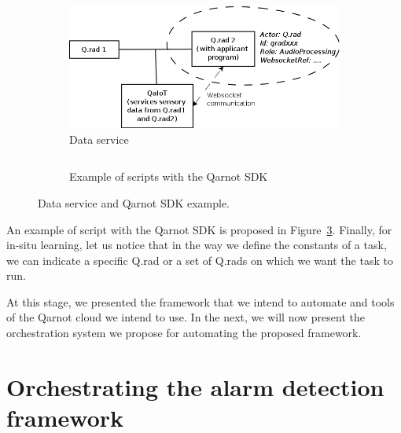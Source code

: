 \documentclass[10pt, conference, compsocconf]{IEEEtran}
\begin{document}
	\begin{figure}[ht]
          \begin{subfigure}[b]{0.4\textwidth}
            \captionsetup{skip=0pt}
            \centering
            \includegraphics[scale=0.25]{./Figures/DataService.png}
            \caption{Data service \label{subfig:qaiot}}
          \end{subfigure}
          \begin{subfigure}[b]{0.6\textwidth}
            \captionsetup{skip=0pt}
            \centering
            \inputminted[baselinestretch=1, bgcolor=LightGray, fontsize=\scriptsize]{python}{sample.py}
            \caption{Example of scripts with the Qarnot SDK \label{subfig:sample}}
          \end{subfigure}
          \caption{Data service and Qarnot SDK example.} 
          \label{fig:arch}
	\end{figure}

An example of script with the Qarnot SDK is proposed in Figure~\ref{fig:arch}. Finally, for in-situ learning, let us notice that 
in the way we define the constants of a task, we can indicate a specific Q.rad or a set of Q.rads on which we want the task to run.

At this stage, we presented the framework that we intend to automate and tools of the Qarnot cloud we intend to use. 
In the next, we will now present the orchestration system we propose for automating the proposed framework. 

\section{Orchestrating the alarm detection framework} \label{Orchestrator}
\end{document}
